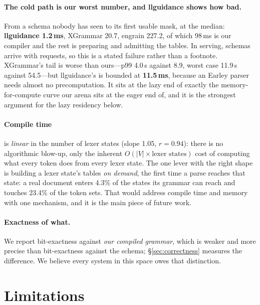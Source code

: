 \documentclass{article}
\begin{document}
\paragraph{The cold path is our worst number, and llguidance shows how bad.}
From a schema nobody has seen to its first usable mask, at the median:
\textbf{llguidance 1.2\,ms}, XGrammar 20.7, engrain 227.2, of which 98\,ms is
our compiler and the rest is preparing and admitting the tables. In serving,
schemas arrive with requests, so this is a stated failure rather than a
footnote. XGrammar's tail is worse than ours---p99 4.0\,s against 8.9, worst
case 11.9\,s against 54.5---but llguidance's is bounded at \textbf{11.5\,ms},
because an Earley parser needs almost no precomputation. It sits at the lazy
end of exactly the memory-for-compute curve our arena sits at the eager end of,
and it is the strongest argument for the lazy residency below.

\paragraph{Compile time} is \emph{linear} in the number of lexer states (slope
1.05, $r=0.94$): there is no algorithmic blow-up, only the inherent
$O(|V| \times \text{lexer states})$ cost of computing what every token does
from every lexer state. The one lever with the right shape is building a lexer
state's tables \emph{on demand}, the first time a parse reaches that state: a
real document enters 4.3\% of the states its grammar can reach and touches
23.4\% of the token sets. That would address compile time and memory with one
mechanism, and it is the main piece of future work.

\paragraph{Exactness of what.} We report bit-exactness against \emph{our
compiled grammar}, which is weaker and more precise than bit-exactness against
the schema; \S\ref{sec:correctness} measures the difference. We believe every
system in this space owes that distinction.

\section{Limitations}
\label{sec:limitations}
\end{document}
